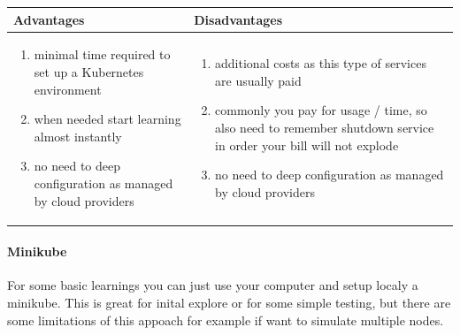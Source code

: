 \begin{tabularx}{\textwidth}{|X|X|}
	\hline
	\textbf{Advantages} & \textbf{Disadvantages} \\
	\hline
	\begin{enumerate}
		\item minimal time required to set up a Kubernetes environment
		\item when needed start learning almost instantly
		\item no need to deep configuration as managed by cloud providers
	\end{enumerate}
	
	&
	
	\begin{enumerate}
		\item additional costs as this type of services are usually paid
		\item commonly you pay for usage / time, so also need to remember shutdown service in order your bill will not explode
		\item no need to deep configuration as managed by cloud providers
	\end{enumerate}\\
	\hline
\end{tabularx}


\paragraph{Minikube} For some basic learnings you can just use your computer and setup localy a minikube. This is great for inital explore or for some simple testing, but there are some limitations of this appoach for example if want to simulate multiple nodes.\\

